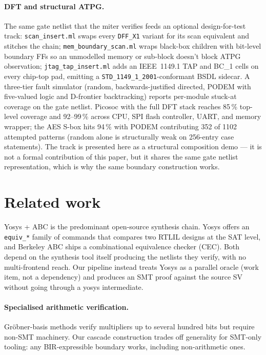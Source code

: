 \documentclass[11pt,a4paper]{article}
\begin{document}
\paragraph{DFT and structural ATPG.} The same gate netlist that the
miter verifies feeds an optional design-for-test track:
\texttt{scan\_insert.ml} swaps every \texttt{DFF\_X1} variant for its
scan equivalent and stitches the chain;
\texttt{mem\_boundary\_scan.ml} wraps black-box children with
bit-level boundary FFs so an unmodelled memory or sub-block doesn't
block ATPG observation; \texttt{jtag\_tap\_insert.ml} adds an
IEEE~1149.1 TAP and BC\_1 cells on every chip-top pad, emitting a
\texttt{STD\_1149\_1\_2001}-conformant BSDL sidecar.  A three-tier
fault simulator (random, backwards-justified directed, PODEM with
five-valued logic and D-frontier backtracking) reports per-module
stuck-at coverage on the gate netlist.  Picosoc with the full DFT
stack reaches 85\,\% top-level coverage and 92--99\,\% across CPU,
SPI flash controller, UART, and memory wrapper; the AES S-box hits
94\,\% with PODEM contributing 352 of 1102 attempted patterns
(random alone is structurally weak on 256-entry case statements).
The track is presented here as a structural composition demo --- it
is not a formal contribution of this paper, but it shares the same
gate netlist representation, which is why the same boundary
construction works.

\section{Related work}

Yosys + ABC \cite{wolf2013yosys,brayton2010abc} is the
predominant open-source synthesis chain.  Yosys offers an
\texttt{equiv\_*} family of commands that compares two RTLIL
designs at the SAT level, and Berkeley ABC ships a combinational
equivalence checker (CEC).  Both depend on the synthesis tool
itself producing the netlists they verify, with no
multi-frontend reach.  Our pipeline instead treats Yosys as a
parallel oracle (work item, not a dependency) and produces an
SMT proof against the source SV without going through a yosys
intermediate.

\paragraph{Specialised arithmetic verification.} Gr\"obner-basis
methods \cite{ciesielski2017verifying} verify multipliers up to
several hundred bits but require non-SMT machinery.  Our cascade
construction trades off generality for SMT-only tooling: any
BIR-expressible boundary works, including non-arithmetic ones.
\end{document}
